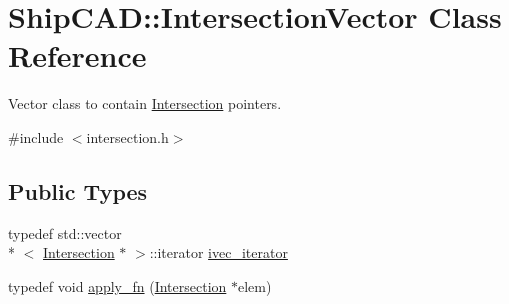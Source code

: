 \hypertarget{classShipCAD_1_1IntersectionVector}{\section{Ship\-C\-A\-D\-:\-:Intersection\-Vector Class Reference}
\label{classShipCAD_1_1IntersectionVector}
}


Vector class to contain \hyperlink{classShipCAD_1_1Intersection}{Intersection} pointers.  




{\ttfamily \#include $<$intersection.\-h$>$}

\subsection*{Public Types}
\begin{DoxyCompactItemize}
\item 
typedef std\-::vector\\*
$<$ \hyperlink{classShipCAD_1_1Intersection}{Intersection} $\ast$ $>$\-::iterator \hyperlink{classShipCAD_1_1IntersectionVector_a02685a86dd24a49a1664a07172d709ff}{ivec\-\_\-iterator}
\item 
typedef void \hyperlink{classShipCAD_1_1IntersectionVector_a15b8a08f6a1b232f9825c6cbbc0fa9a9}{apply\-\_\-fn} (\hyperlink{classShipCAD_1_1Intersection}{Intersection} $\ast$elem)
\end{DoxyCompactItemize}
